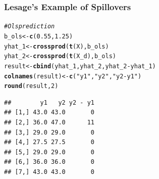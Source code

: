 \documentclass[english,10pt]{beamer}\usepackage[]{graphicx}\usepackage[]{xcolor}
\makeatletter
\newcommand{\hlnum}[1]{\textcolor[rgb]{0.686,0.059,0.569}{#1}}%
\newcommand{\hlsng}[1]{\textcolor[rgb]{0.192,0.494,0.8}{#1}}%
\newcommand{\hlcom}[1]{\textcolor[rgb]{0.678,0.584,0.686}{\textit{#1}}}%
\newcommand{\hlopt}[1]{\textcolor[rgb]{0,0,0}{#1}}%
\newcommand{\hldef}[1]{\textcolor[rgb]{0.345,0.345,0.345}{#1}}%
\newcommand{\hlkwb}[1]{\textcolor[rgb]{0.69,0.353,0.396}{#1}}%
\newcommand{\hlkwd}[1]{\textcolor[rgb]{0.737,0.353,0.396}{\textbf{#1}}}%
\newenvironment{kframe}{%
 \def\at@end@of@kframe{}%
 \ifinner\ifhmode%
  \def\at@end@of@kframe{\end{minipage}}%
  \begin{minipage}{\columnwidth}%
 \fi\fi%
 \def\FrameCommand##1{\hskip\@totalleftmargin \hskip-\fboxsep
 \colorbox{shadecolor}{##1}\hskip-\fboxsep
     \hskip-\linewidth \hskip-\@totalleftmargin \hskip\columnwidth}%
 \MakeFramed {\advance\hsize-\width
   \@totalleftmargin\z@ \linewidth\hsize
   \@setminipage}}%
 {\par\unskip\endMakeFramed%
 \at@end@of@kframe}
\newenvironment{knitrout}{}{} %
\makeatother
\begin{document}
\begin{frame}[fragile]
  \frametitle{Lesage's Example of Spillovers}
\begin{knitrout}
\color{fgcolor}\begin{kframe}
\begin{alltt}
\hlcom{# Ols prediction}
\hldef{b_ols} \hlkwb{<-} \hlkwd{c}\hldef{(}\hlnum{0.55}\hldef{,} \hlnum{1.25}\hldef{)}
\hldef{yhat_1} \hlkwb{<-} \hlkwd{crossprod}\hldef{(}\hlkwd{t}\hldef{(X), b_ols)}
\hldef{yhat_2} \hlkwb{<-} \hlkwd{crossprod}\hldef{(}\hlkwd{t}\hldef{(X_d), b_ols)}
\hldef{result} \hlkwb{<-} \hlkwd{cbind}\hldef{(yhat_1, yhat_2, yhat_2} \hlopt{-} \hldef{yhat_1)}
\hlkwd{colnames}\hldef{(result)} \hlkwb{<-} \hlkwd{c}\hldef{(}\hlsng{"y1"}\hldef{,} \hlsng{"y2"}\hldef{,} \hlsng{"y2 - y1"}\hldef{)}
\hlkwd{round}\hldef{(result,} \hlnum{2}\hldef{)}
\end{alltt}
\begin{verbatim}
##        y1   y2 y2 - y1
## [1,] 43.0 43.0       0
## [2,] 36.0 47.0      11
## [3,] 29.0 29.0       0
## [4,] 27.5 27.5       0
## [5,] 29.0 29.0       0
## [6,] 36.0 36.0       0
## [7,] 43.0 43.0       0
\end{verbatim}
\end{kframe}
\end{knitrout}
\end{frame}
\end{document}
